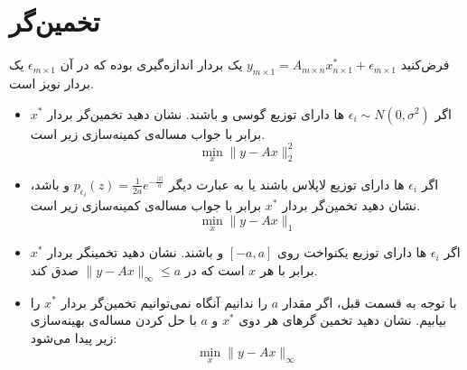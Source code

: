 \section{تخمین‌گر 
	}
فرض‌کنید 
$y_{m\times1}=A_{m\times n}x^{*}_{n\times1}+\epsilon_{m\times1}$
یک بردار اندازه‌گیری بوده که در آن
$\epsilon_{m\times1}$
یک بردار نویز است.


\begin{itemize}
\item
 اگر 
$\epsilon_{i}\sim N(0,\sigma^{2})$
ها دارای توزیع گوسی و  باشند. نشان دهید تخمین‌گر 
بردار $x^{*}$ برابر با جواب مساله‌ی کمینه‌سازی زیر است.
\[
\min_{x} \|y-Ax\|_{2}^{2}
\]
\item
 اگر 
$\epsilon_{i}$
ها دارای توزیع لاپلاس باشند یا به عبارت دیگر 
$p_{\epsilon_{i}}(z)=\frac{1}{2a}e^{-\frac{|z|}{a}}$
و  باشد، نشان دهید تخمین‌گر 
بردار $x^{*}$ برابر با جواب مساله‌ی کمینه‌سازی زیر است.
\[
\min_{x} \|y-Ax\|_{1}
\]

\item
 اگر 
$\epsilon_{i}$
ها دارای توزیع یکنواخت روی $[-a,a]$ و  باشند. نشان دهید تخمینگر 
بردار $x^{*}$ برابر با هر $x$ است که در
$\|y-Ax\|_{\infty}\le a$
صدق کند.

\item 
 با توجه به قسمت قبل،  اگر مقدار $a$ را ندانیم آنگاه نمی‌توانیم تخمین‌گر 
بردار $x^{*}$ را بیابیم. نشان دهید تخمین گرهای 
هر دوی $x^{*}$ و $a$ با حل کردن مساله‌ی بهینه‌سازی زیر پیدا می‌شود:
\[
\min_{x}\|y-Ax\|_{\infty}
\]
\end{itemize}